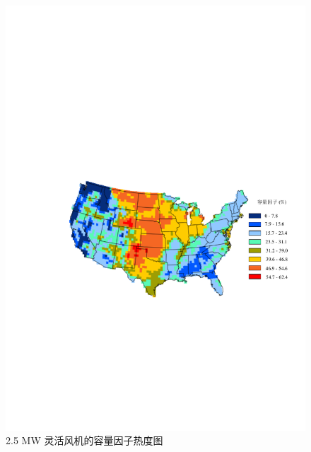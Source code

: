 \begin{figure}[!htp] %
  \centering
  \includegraphics[scale=0.85]{figures/Chap5-10-CA-WT-25-VDM2-Abs-2.pdf}
  \caption{2.5 MW 灵活风机的容量因子热度图}
  \label{fig:cawt-usa-cf-abs}
\end{figure}

